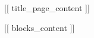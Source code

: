 \documentclass[paper=a4, fontsize=14pt, pagesize, DIV=calc, oneside]{scrreport}
\begin{document}
[[ title_page_content ]]

\pagestyle{plain}
\setcounter{page}{2}

\newpage
\tableofcontents
\newpage

[[ blocks_content ]]
\end{document}
